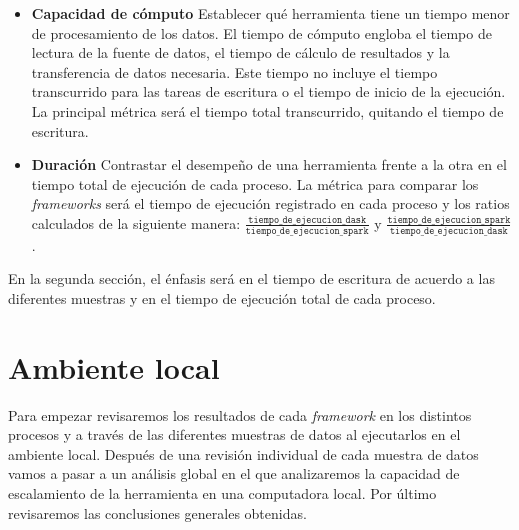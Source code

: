 \begin{itemize}
	\item \textbf{Capacidad de cómputo} Establecer qué herramienta tiene un tiempo menor de procesamiento de los datos. El tiempo de cómputo engloba el tiempo de lectura de la fuente de datos, el tiempo de cálculo de resultados y la transferencia de datos necesaria. Este tiempo no incluye el tiempo transcurrido para las tareas de escritura o el tiempo de inicio de la ejecución. La principal métrica será el tiempo total transcurrido, quitando el tiempo de escritura.
	
	\item \textbf{Duración} Contrastar el desempeño de una herramienta frente a la otra en el tiempo total de ejecución de cada proceso. La métrica para comparar los \textit{frameworks} será el tiempo de ejecución registrado en cada proceso y los ratios calculados de la siguiente manera: $\frac{\texttt{tiempo\_de\_ejecucion\_dask}}{\texttt{tiempo\_de\_ejecucion\_spark}}$ y $\frac{\texttt{tiempo\_de\_ejecucion\_spark}}{\texttt{tiempo\_de\_ejecucion\_dask}}$.
\end{itemize}

En la segunda sección, el énfasis será en el tiempo de escritura de acuerdo a las diferentes muestras y en el tiempo de ejecución total de cada proceso.

\section{Ambiente local}
\label{section:resultados-ambiente-local}

Para empezar revisaremos los resultados de cada \textit{framework} en los distintos procesos y a través de las diferentes muestras de datos al ejecutarlos en el ambiente local. Después de una revisión individual de cada muestra de datos vamos a pasar a un análisis global en el que analizaremos la capacidad de escalamiento de la herramienta en una computadora local. Por último revisaremos las conclusiones generales obtenidas.

